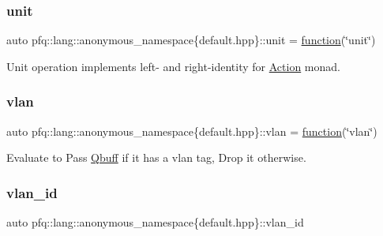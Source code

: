 \subsubsection{\texorpdfstring{unit}{unit}}
{\footnotesize\ttfamily auto pfq\+::lang\+::anonymous\+\_\+namespace\{default.\+hpp\}\+::unit = \hyperlink{namespacepfq_1_1lang_a1a4638059d700ae08d0ca63886ff2bb3}{function}(\char`\"{}unit\char`\"{})}



Unit operation implements left-\/ and right-\/identity for \hyperlink{structpfq_1_1lang_1_1Action}{Action} monad. 

\mbox{\label{namespacepfq_1_1lang_1_1anonymous__namespace_02default_8hpp_03_a747e907a678ad69c5bfdd3048a239b6a}} 
\subsubsection{\texorpdfstring{vlan}{vlan}}
{\footnotesize\ttfamily auto pfq\+::lang\+::anonymous\+\_\+namespace\{default.\+hpp\}\+::vlan = \hyperlink{namespacepfq_1_1lang_a1a4638059d700ae08d0ca63886ff2bb3}{function}(\char`\"{}vlan\char`\"{})}



Evaluate to {\ttfamily Pass} \hyperlink{structpfq_1_1lang_1_1Qbuff}{Qbuff} if it has a vlan tag, {\ttfamily Drop} it otherwise. 

\mbox{\label{namespacepfq_1_1lang_1_1anonymous__namespace_02default_8hpp_03_ad2a631020f34bf10335ebb0e79f03920}} 
\subsubsection{\texorpdfstring{vlan\+\_\+id}{vlan\_id}}
{\footnotesize\ttfamily auto pfq\+::lang\+::anonymous\+\_\+namespace\{default.\+hpp\}\+::vlan\+\_\+id}

